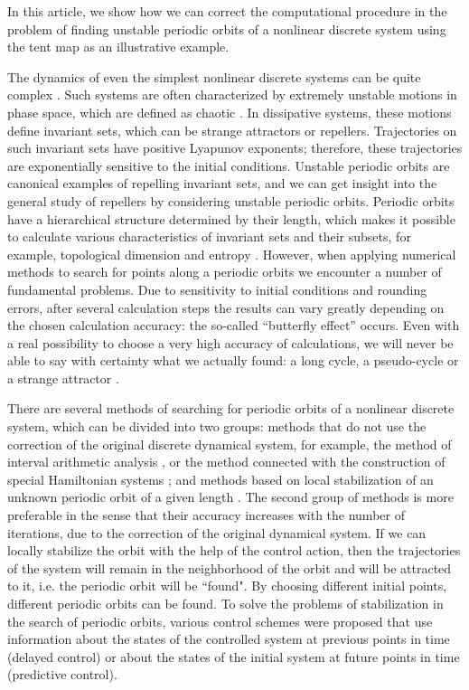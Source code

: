 \documentclass[12pt,a4paper]{amsart}
\begin{document}
In this article, we show how we can correct the computational procedure in the problem of finding unstable periodic orbits 
of a nonlinear discrete system using the tent map as an illustrative example.

The dynamics of even the simplest nonlinear discrete systems can be quite complex \cite{Devaney, Chen, Andr}. Such systems are often characterized 
by extremely unstable motions in phase space, which are defined as chaotic \cite{Devaney}. In dissipative systems, these motions define invariant sets, 
which can be strange attractors or repellers. Trajectories on such invariant sets have positive Lyapunov exponents; therefore, these 
trajectories are exponentially sensitive to the initial conditions. 
Unstable periodic orbits are canonical examples of repelling invariant sets, and we can get insight into the general study of repellers by considering 
 unstable periodic orbits. 
 Periodic orbits have a hierarchical structure determined by their length, which 
makes it possible to calculate various characteristics of invariant sets and their subsets, for example, topological dimension and entropy \cite{Biham}. 
However, when applying numerical methods to search for points along a periodic orbits  we encounter a number 
of fundamental problems. Due to sensitivity to initial conditions and rounding errors, after several calculation steps the results can 
vary greatly depending on the chosen calculation accuracy: the so-called ``butterfly effect'' occurs. Even with a real possibility to choose 
a very high accuracy of calculations, we will never be able to say with certainty what we actually found: a long cycle, a pseudo-cycle or 
a strange attractor \cite{Lozi}.

There are several methods of searching for periodic orbits of a nonlinear discrete system, which can be divided into two groups: methods 
that do not use the correction of the original discrete dynamical system, for example, the method of interval arithmetic analysis \cite{Zyg, Gal2002, Gal2001}, 
or the method connected with the construction of special Hamiltonian systems \cite{Biham}; and methods based on local stabilization of 
an unknown periodic orbit of a given length \cite{Ott, Qian, Aleks, Yang, Miller, DSLS}. The second group of methods is more preferable in the sense that their accuracy increases with the number of iterations, due to the correction of the original dynamical system. If  we 
can locally stabilize the orbit with the help of the control action, then the trajectories of the system will remain in the neighborhood of the orbit and will be attracted to it, 
i.e. the periodic orbit will be ``found". By choosing different initial points, different periodic orbits can be found. To solve the problems of 
stabilization in the search of periodic orbits,  various control schemes were proposed that use information about the states of the controlled 
system at previous points in time \cite{Pyr, Vie, DK, Mor} (delayed control) or about the states of the initial system at future points in time \cite{Polyak, Ushio, Shal, DSI} 
(predictive control). 
\end{document}
